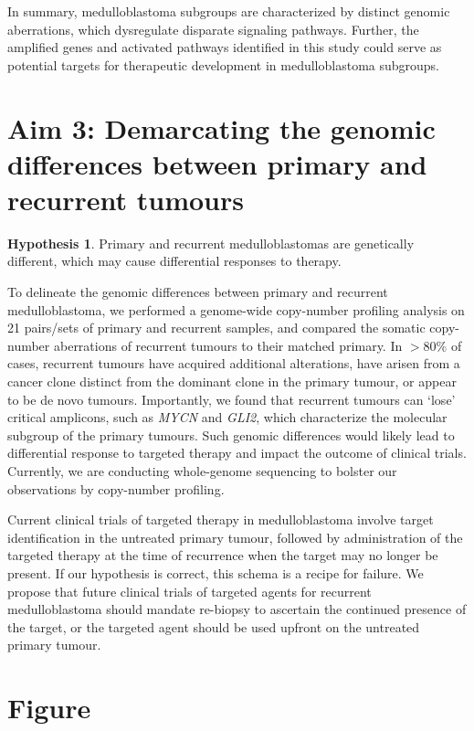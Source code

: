 \documentclass[11pt,letterpaper]{article}
\theoremstyle{definition}
\newtheorem*{hypothesis}{Hypothesis}
\begin{document}
In summary, medulloblastoma subgroups are characterized by distinct genomic aberrations, which dysregulate disparate signaling pathways. Further, the amplified genes and activated pathways identified in this study could serve as potential targets for therapeutic development in medulloblastoma subgroups.

\section{Aim 3: Demarcating the genomic differences between primary and recurrent tumours}

\begin{hypothesis}
Primary and recurrent medulloblastomas are genetically different, which may cause differential responses to therapy.
\end{hypothesis}

To delineate the genomic differences between primary and recurrent medulloblastoma, we performed a genome-wide copy-number profiling analysis on 21 pairs/sets of primary and recurrent samples, and compared the somatic copy-number aberrations of recurrent tumours to their matched primary. In $>80\%$ of cases, recurrent tumours have acquired additional alterations, have arisen from a cancer clone distinct from the dominant clone in the primary tumour, or appear to be de novo tumours. Importantly, we found that recurrent tumours can ‘lose’ critical amplicons, such as \emph{MYCN} and \emph{GLI2}, which characterize the molecular subgroup of the primary tumours. Such genomic differences would likely lead to differential response to targeted therapy and impact the outcome of clinical trials. Currently, we are conducting whole-genome sequencing to bolster our observations by copy-number profiling.

Current clinical trials of targeted therapy in medulloblastoma involve target identification in the untreated primary tumour, followed by administration of the targeted therapy at the time of recurrence when the target may no longer be present. If our hypothesis is correct, this schema is a recipe for failure.  We propose that future clinical trials of targeted agents for recurrent medulloblastoma should mandate re-biopsy to ascertain the continued presence of the target, or the targeted agent should be used upfront on the untreated primary tumour.

\clearpage

\section{Figure}
\end{document}

